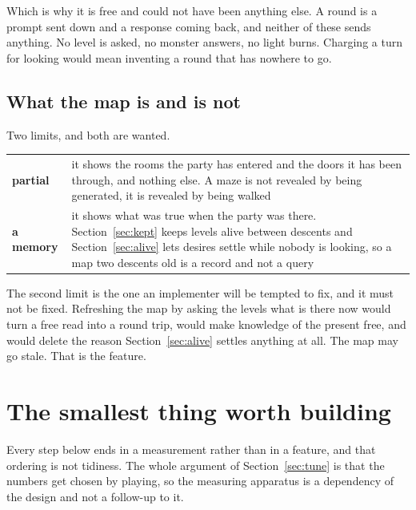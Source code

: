 \documentclass[11pt,a4paper]{article}
\begin{document}
\begin{sectionbox}
Which is why it is free and could not have been anything else. A round is a prompt sent down and a
response coming back, and neither of these sends anything. No level is asked, no monster answers,
no light burns. Charging a turn for looking would mean inventing a round that has nowhere to go.
\end{sectionbox}

\subsection{What the map is and is not}

Two limits, and both are wanted.

\begin{center}
\begin{tabular}{@{}l@{\hspace{4mm}}>{\raggedright\arraybackslash}p{}@{}}
\toprule
\textbf{partial} & it shows the rooms the party has entered and the doors it has been through, and
nothing else. A maze is not revealed by being generated, it is revealed by being walked \\[1mm]
\textbf{a memory} & it shows what was true when the party was there. Section~\ref{sec:kept} keeps
levels alive between descents and Section~\ref{sec:alive} lets desires settle while nobody is
looking, so a map two descents old is a record and not a query \\
\bottomrule
\end{tabular}
\end{center}

\begin{alarmbox}
The second limit is the one an implementer will be tempted to fix, and it must not be fixed.
Refreshing the map by asking the levels what is there now would turn a free read into a round trip,
would make knowledge of the present free, and would delete the reason
Section~\ref{sec:alive} settles anything at all. The map may go stale. That is the feature.
\end{alarmbox}

\section{The smallest thing worth building}
\label{sec:smallest}

Every step below ends in a measurement rather than in a feature, and that ordering is not
tidiness. The whole argument of Section~\ref{sec:tune} is that the numbers get chosen by playing,
so the measuring apparatus is a dependency of the design and not a follow-up to it.
\end{document}
